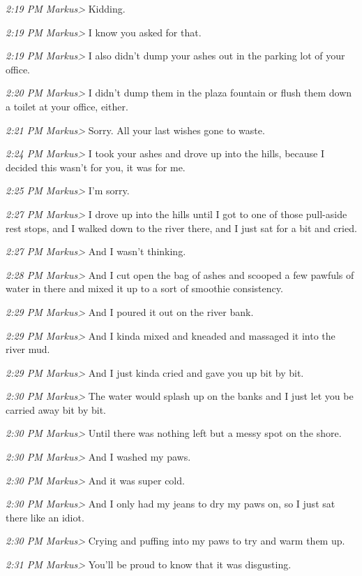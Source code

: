 {\emph{2:19 PM Markus\textgreater{}} Kidding.

\emph{2:19 PM Markus\textgreater{}} I know you asked for that.

\emph{2:19 PM Markus\textgreater{}} I also didn't dump your ashes out in
the parking lot of your office.

\emph{2:20 PM Markus\textgreater{}} I didn't dump them in the plaza
fountain or flush them down a toilet at your office, either.

\emph{2:21 PM Markus\textgreater{}} Sorry. All your last wishes gone to
waste.

\emph{2:24 PM Markus\textgreater{}} I took your ashes and drove up into
the hills, because I decided this wasn't for you, it was for me.

\emph{2:25 PM Markus\textgreater{}} I'm sorry.

\emph{2:27 PM Markus\textgreater{}} I drove up into the hills until I
got to one of those pull-aside rest stops, and I walked down to the
river there, and I just sat for a bit and cried.

\emph{2:27 PM Markus\textgreater{}} And I wasn't thinking.

\emph{2:28 PM Markus\textgreater{}} And I cut open the bag of ashes and
scooped a few pawfuls of water in there and mixed it up to a sort of
smoothie consistency.

\emph{2:29 PM Markus\textgreater{}} And I poured it out on the river
bank.

\emph{2:29 PM Markus\textgreater{}} And I kinda mixed and kneaded and
massaged it into the river mud.

\emph{2:29 PM Markus\textgreater{}} And I just kinda cried and gave you
up bit by bit.

\emph{2:30 PM Markus\textgreater{}} The water would splash up on the
banks and I just let you be carried away bit by bit.

\emph{2:30 PM Markus\textgreater{}} Until there was nothing left but a
messy spot on the shore.

\emph{2:30 PM Markus\textgreater{}} And I washed my paws.

\emph{2:30 PM Markus\textgreater{}} And it was super cold.

\emph{2:30 PM Markus\textgreater{}} And I only had my jeans to dry my
paws on, so I just sat there like an idiot.

\emph{2:30 PM Markus\textgreater{}} Crying and puffing into my paws to
try and warm them up.

\emph{2:31 PM Markus\textgreater{}} You'll be proud to know that it was
disgusting.

}
